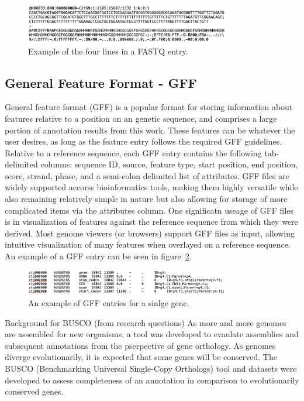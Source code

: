 \begin{figure}
  \centering
  \includegraphics[width=0.8\textwidth]{figures/fastq-example.png}
  \caption{Example of the four lines in a FASTQ entry.}
  \label{fig:fastq-example}
\end{figure}

\subsection{General Feature Format - GFF}
General feature format (GFF) is a popular format for storing
information about features relative to a position on an genetic
sequence, and comprises a large portion of annotation results from
this work. These features can be whatever the user desires, as long as
the feature entry follows the required GFF guidelines. Relative to a
reference sequence, each GFF entry contains the following
tab-delimited columns: sequence ID, source, feature type, start
position, end position, score, strand, phase, and a semi-colon
delimited list of attributes. GFF files are widely supported accorss
bioinformatics tools, making them highly versatile while also
remaining relatively simple in nature but also allowing for storage of
more complicated items via the attributes column. One significatn
useage of GFF files is in visualization of features against the
reference sequence from which they were derived. Most genome viewers
(or browsers) support GFF files as input, allowing intuitive
visualization of many features when overlayed on a reference
sequence. An example of a GFF entry can be seen in
figure~\ref{fig:gff-example}.

\begin{figure}
  \centering
  \includegraphics[width=0.8\textwidth]{figures/gff-example.png}
  \caption{An example of GFF entries for a sinlge gene.}
  \label{fig:gff-example}
\end{figure}

Background for BUSCO (from research questions)
As more and more genomes are assembled for new organisms, a tool was
developed to evaulate assemblies and subsequent annotations from the
pserpective of gene orthology. As genomes diverge evolutionarily, it
is expected that some genes will be conserved. The BUSCO (Benchmarking
Universal Single-Copy Orthologs) tool and datasets were developed to
assess completeness of an annotation in comparison to evolutionarily
conserved genes.

